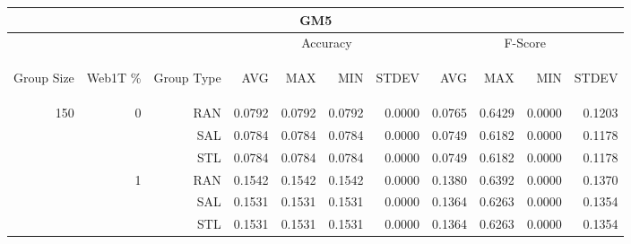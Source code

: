 \begin{center}
\begin{table}[htbp]
\begin{tabular}{ | r | r | r | r | r | r | r | r | r | r | r |}
\hline
\multicolumn{11}{|c|}{GM5}\\
\hline
 & & & \multicolumn{4}{|c|}{Accuracy} & \multicolumn{4}{|c|}{F-Score}\\ \cline{4-11}
\begin{sideways}Group Size\end{sideways} & \begin{sideways}Web1T \%\end{sideways} & \begin{sideways}Group Type\end{sideways} & \begin{sideways}AVG\end{sideways} & \begin{sideways}MAX\end{sideways} & \begin{sideways}MIN\end{sideways} & \begin{sideways}STDEV\end{sideways} & \begin{sideways}AVG\end{sideways} & \begin{sideways}MAX\end{sideways} & \begin{sideways}MIN\end{sideways} & \begin{sideways}STDEV\end{sideways}\\
\hline
\multirow{18}{*}{150}
 & \multirow{3}{*}{0} & RAN & 0.0792 & 0.0792 & 0.0792 & 0.0000 & 0.0765 & 0.6429 & 0.0000 & 0.1203\\ \cline{3-11}
 &   & SAL & 0.0784 & 0.0784 & 0.0784 & 0.0000 & 0.0749 & 0.6182 & 0.0000 & 0.1178\\ \cline{3-11}
 &   & STL & 0.0784 & 0.0784 & 0.0784 & 0.0000 & 0.0749 & 0.6182 & 0.0000 & 0.1178\\ \cline{2-11}
 & \multirow{3}{*}{1} & RAN & 0.1542 & 0.1542 & 0.1542 & 0.0000 & 0.1380 & 0.6392 & 0.0000 & 0.1370\\ \cline{3-11}
 &   & SAL & 0.1531 & 0.1531 & 0.1531 & 0.0000 & 0.1364 & 0.6263 & 0.0000 & 0.1354\\ \cline{3-11}
 &   & STL & 0.1531 & 0.1531 & 0.1531 & 0.0000 & 0.1364 & 0.6263 & 0.0000 & 0.1354\\ \cline{2-11}

\end{tabular}
\end{table}
\end{center}
